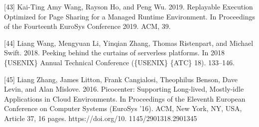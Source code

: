 \documentclass[
  10
]{article}
\begin{document}
{[}43{]} Kai-Ting Amy Wang, Rayson Ho, and Peng Wu. 2019. Replayable
Execution Optimized for Page Sharing for a Managed Runtime Environment.
In Proceedings of the Fourteenth EuroSys Conference 2019. ACM, 39.

{[}44{]} Liang Wang, Mengyuan Li, Yinqian Zhang, Thomas Ristenpart, and
Michael Swift. 2018. Peeking behind the curtains of serverless
platforms. In 2018 \{USENIX\} Annual Technical Conference (\{USENIX\}
\{ATC\} 18). 133--146.

{[}45{]} Liang Zhang, James Litton, Frank Cangialosi, Theophilus Benson,
Dave Levin, and Alan Mislove. 2016. Picocenter: Supporting Long-lived,
Mostly-idle Applications in Cloud Environments. In Proceedings of the
Eleventh European Conference on Computer Systems (EuroSys '16). ACM, New
York, NY, USA, Article 37, 16 pages. https://doi.org/10.
1145/2901318.2901345
\end{document}

